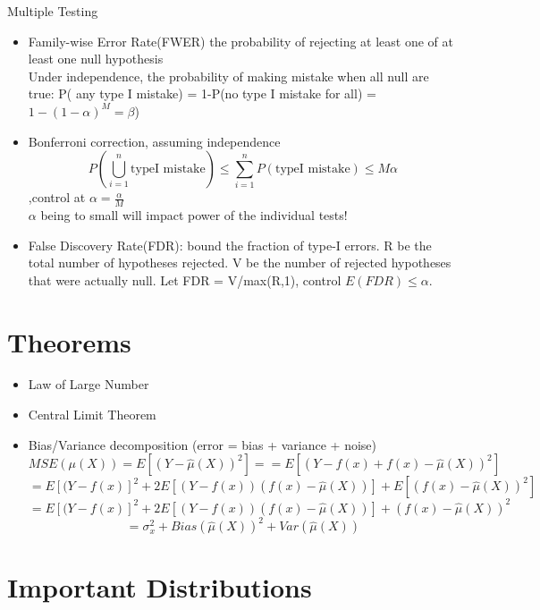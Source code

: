 \documentclass[11pt, openany]{book}              %
\begin{document}
Multiple Testing 

\begin{itemize}
    \item Family-wise Error Rate(FWER) the probability of rejecting at least one of at least one null hypothesis \\ 
    Under independence, the probability of making mistake when all null are true: P( any type I mistake) = 1-P(no type I mistake for all) = $1-(1-\alpha)^M=\beta$) \\
    \item Bonferroni correction, assuming independence 
    $$P(\bigcup_{i=1}^n \text{typeI mistake}) \leq \sum_{i=1}^n P(\text{typeI mistake}) \leq M\alpha$$,control at $\alpha=\frac{\alpha}{M}$ \\
    $\alpha$ being to small will impact power of the individual tests!
    \item False Discovery Rate(FDR): bound the fraction of type-I errors. R be the total number of hypotheses rejected. V be the number of rejected hypotheses that were actually null. Let FDR = V/max(R,1), control $E(FDR) \leq \alpha$.
\end{itemize}

\section{Theorems}
\begin{itemize}
    \item Law of Large Number
    \item Central Limit Theorem
        \item Bias/Variance decomposition (error = bias + variance + noise)
        $$MSE(\mu(X) ) = E[(Y-\hat{\mu}(X))^2]  = = E[(Y-f(x) + f(x) -\hat{\mu}(X))^2]$$
    $$= E[(Y-f(x)]^2 + 2E[(Y-f(x))(f(x) - \hat{\mu}(X))] + E[(f(x)-\hat{\mu}(X))^2]$$
     $$= E[(Y-f(x)]^2 + 2E[(Y-f(x))(f(x) - \hat{\mu}(X))] + (f(x)-\hat{\mu}(X))^2$$
    $$ =\sigma_x^2 + Bias(\hat{\mu}(X))^2 + Var(\hat{\mu}(X))$$
\end{itemize}

\section{Important Distributions}
\end{document}
